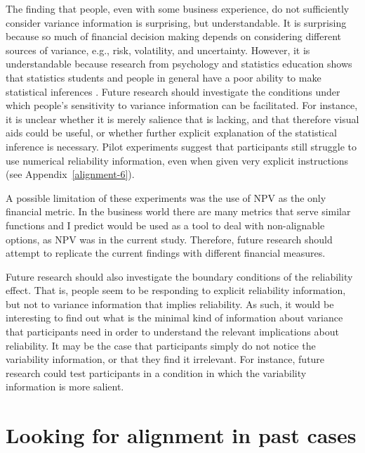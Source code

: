 \documentclass[a4paper, nobind, dvipsnames]{templates/ociamthesis}
\theoremstyle{definition}
\theoremstyle{definition}
\theoremstyle{definition}
\theoremstyle{definition}
\theoremstyle{remark}
\begin{document}
The finding that people, even with some business experience, do not sufficiently
consider variance information is surprising, but understandable. It is
surprising because so much of financial decision making depends on considering
different sources of variance, e.g., risk, volatility, and uncertainty. However,
it is understandable because research from psychology and statistics education
shows that statistics students and people in general have a poor ability to make
statistical inferences \autocite{galesic2010,konold1993}. Future research should
investigate the conditions under which people's sensitivity to variance
information can be facilitated. For instance, it is unclear whether it is merely
salience that is lacking, and that therefore visual aids could be useful, or
whether further explicit explanation of the statistical inference is necessary.
Pilot experiments suggest that participants still struggle to use numerical
reliability information, even when given very explicit instructions (see
Appendix~\ref{alignment-6}).

A possible limitation of these experiments was the use of NPV as the only
financial metric. In the business world there are many metrics that serve
similar functions and I predict would be used as a tool to deal with
non-alignable options, as NPV was in the current study. Therefore, future
research should attempt to replicate the current findings with different
financial measures.

Future research should also investigate the boundary conditions of the
reliability effect. That is, people seem to be responding to explicit
reliability information, but not to variance information that implies
reliability. As such, it would be interesting to find out what is the minimal
kind of information about variance that participants need in order to understand
the relevant implications about reliability. It may be the case that
participants simply do not notice the variability information, or that they find
it irrelevant. For instance, future research could test participants in a
condition in which the variability information is more salient.

\newpage

\printbibliography[segment=\therefsegment,heading=subbibintoc]

\hypertarget{interstitial-2}{%
\chapter{Looking for alignment in past cases}\label{interstitial-2}}
\end{document}
